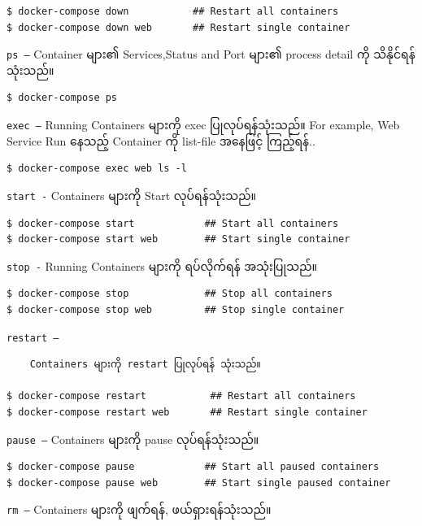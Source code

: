 \documentclass{article}
\begin{document}
\begin{verbatim}
$ docker-compose down           ## Restart all containers
$ docker-compose down web       ## Restart single container
\end{verbatim}

\texttt{ps –} Container များ၏ Services,Status and Port များ၏ process
detail ကို သိနိုင်ရန် သုံးသည်။

\begin{verbatim}
$ docker-compose ps
\end{verbatim}

\texttt{exec –} Running Containers များကို exec ပြုလုပ်ရန်သုံးသည်။ For
example, Web Service Run နေသည့် Container ကို list-file အနေဖြင့်
ကြည့်ရန်..

\begin{verbatim}
$ docker-compose exec web ls -l
\end{verbatim}

\texttt{start -} Containers များကို Start လုပ်ရန်သုံးသည်။

\begin{verbatim}
$ docker-compose start            ## Start all containers
$ docker-compose start web        ## Start single container
\end{verbatim}

\texttt{stop -} Running Containers များကို ရပ်လိုက်ရန် အသုံးပြုသည်။

\begin{verbatim}
$ docker-compose stop             ## Stop all containers
$ docker-compose stop web         ## Stop single container
\end{verbatim}

\texttt{restart –}

\begin{verbatim}
    Containers များကို restart ပြုလုပ်ရန် သုံးသည်။

$ docker-compose restart           ## Restart all containers
$ docker-compose restart web       ## Restart single container
\end{verbatim}

\texttt{pause –} Containers များကို pause လုပ်ရန်သုံးသည်။

\begin{verbatim}
$ docker-compose pause            ## Start all paused containers
$ docker-compose pause web        ## Start single paused container
\end{verbatim}

\texttt{rm –} Containers များကို ဖျက်ရန်, ဖယ်ရှားရန်သုံးသည်။
\end{document}
